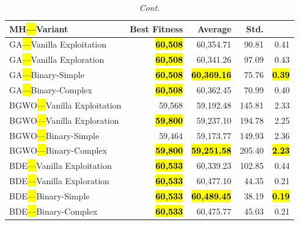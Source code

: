 \documentclass[mathematics,article,accept,moreauthors]{Definitions/mdpi}
\begin{document}
\begin{table}[H]\ContinuedFloat
\caption{\textit{Cont.}}
  \small
  \label{tab:calidad_mknapcb7_29}
  \begin{tabularx}{\textwidth}{lRRRR}
    \toprule
    \textbf{MH\hl{---}Variant} &
    \textbf{Best Fitness} &
    \textbf{Average} &
    \textbf{Std.} &
    \textbf{} \\
    \midrule



    GA\hl{---}Vanilla Exploitation   & \textbf{\hl{60,508}} &         60,354.71 &  90.81 &         0.41 \\
    GA\hl{---}Vanilla Exploration    & \textbf{\hl{60,508}} &         60,341.26 &  97.09 &         0.43 \\
    GA\hl{---}Binary-Simple          & \textbf{\hl{60,508}} & \textbf{\hl{60,369.16}} &  75.76 & \textbf{\hl{0.39}} \\
    GA\hl{---}Binary-Complex         & \textbf{\hl{60,508}} &         60,362.45 &  70.99 &         0.40 \\
    \midrule
    BGWO\hl{---}Vanilla Exploitation &          59,568 &         59,192.48 & 145.81 &         2.33 \\
    BGWO\hl{---}Vanilla Exploration  & \textbf{\hl{59,800}} &         59,237.10 & 194.78 &         2.25 \\
    BGWO\hl{---}Binary-Simple        &          59,464 &         59,173.77 & 149.93 &         2.36 \\
    BGWO\hl{---}Binary-Complex       & \textbf{\hl{59,800}} & \textbf{\hl{59,251.58}} & 205.40 & \textbf{\hl{2.23}} \\
    \midrule
    BDE\hl{---}Vanilla Exploitation  & \textbf{\hl{60,533}} &         60,339.23 & 102.85 &         0.44 \\
    BDE\hl{---}Vanilla Exploration   & \textbf{\hl{60,533}} &         60,477.10 &  44.35 &         0.21 \\
    BDE\hl{---}Binary-Simple         & \textbf{\hl{60,533}} & \textbf{\hl{60,489.45}} &  38.19 & \textbf{\hl{0.19}} \\
    BDE\hl{---}Binary-Complex        & \textbf{\hl{60,533}} &         60,475.77 &  45.03 &         0.21 \\
    \bottomrule
  \end{tabularx}
\end{table}
\end{document}
